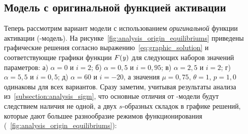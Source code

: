 
\subsection{Модель с оригинальной функцией активации}  \label{subsection:analysis_origin}

Теперь рассмотрим вариант модели с использованием \textit{оригинальной} функции активации (-модель). На рисунке~\ref{fig:analysis_origin_equilibriums} приведены графические решения согласно выражению~\eqref{eq:graphic_solution} и соответствующие графики функции $F(\mathit{y})$ для следующих наборов значений параметров: а) $\alpha = 0  $ и $i = 2$; б) $\alpha = 0,5$ и $i = 0,95$; в) $\alpha = 2,5$ и $i = 2$; г) $\alpha = 5,5$ и $i = 0,5$; д) $\alpha = 60$ и $i = -20$, а значения  $\mu = 0,75$, $\theta = 1$, $p = 1,0$ одинаковы для всех вариантов. Сразу заметим, учитывая результаты анализа из~\autoref{subsection:analysis_sigm}, что основные отличия от -модели будут следствием наличия не одной, а двух $s$-образных складок в графике решений, которые дают большее разнообразие режимов функционирования (\seefigure~\ref{fig:analysis_origin_equilibriums}):
